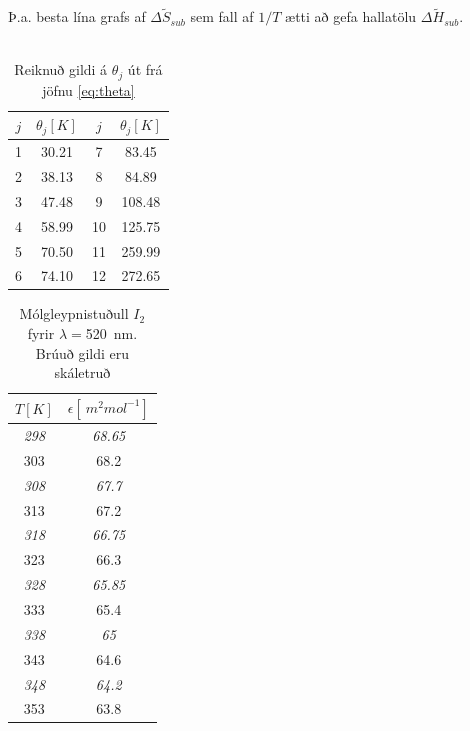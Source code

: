 \documentclass[11pt]{article}
\begin{document}
Þ.a. besta lína grafs af $\Delta\widetilde{S}_{sub}$ sem fall af $1/T$ ætti að gefa hallatölu $\Delta \widetilde{H}_{sub}$.\\
\\
\begin{minipage}{.5\textwidth}
\begin{table}[H]
    \centering
    \caption{Reiknuð gildi á $\theta_j$ út frá jöfnu \ref{eq:theta}} 
    \begin{tabular}{|c|c|c|c|}
    \hline
      $j$   &   $\theta_j[K]$  & $j$   &   $\theta_j[K]$  \\
      \hline
       1    & 30.21 & 7     & 83.45    \\ 
       2    & 38.13 & 8     & 84.89     \\
       3    & 47.48 & 9     & 108.48  \\
       4    & 58.99 & 10    & 125.75   \\
       5    & 70.50 & 11    & 259.99\\
       6    & 74.10 & 12    & 272.65 \\
       \hline
    \end{tabular}
    \label{tab:theta_j}
\end{table}
\end{minipage}
\begin{minipage}{.5\textwidth}
\begin{table}[H]
    \caption{Mólgleypnistuðull $I_2$ fyrir $\lambda =$\SI{520}{nm}.\\Brúuð gildi eru skáletruð}
    \centering
    \begin{tabular}{|c|c|}
    \hline
    $T[K]$         &    $\epsilon[\SI{}{m^2 mol^{-1}}]$  \\\hline
    \textit{298}            &   \textit{68.65}\\
    303            &   68.2\\
    \textit{308}            &   \textit{67.7}\\
    313            &   67.2\\
    \textit{318}            &   \textit{66.75}\\
    323            &   66.3\\
    \textit{328}            &   \textit{65.85}\\
    333            &   65.4\\
    \textit{338}            &   \textit{65}\\
    343            &   64.6\\
    \textit{348}            &   \textit{64.2}\\
    353            &   63.8 \\
    \hline
    \end{tabular}
    \label{tab:my_label}
\end{table}
\end{minipage}
\end{document}
